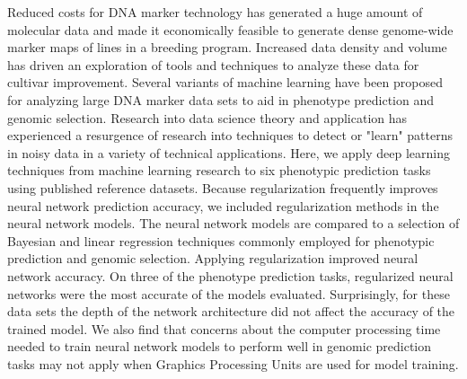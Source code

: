 

Reduced costs for DNA marker technology has generated a huge amount of
molecular data and made it economically feasible to generate dense genome-wide
marker maps of lines in a breeding program. Increased data density and volume
has driven an exploration of tools and techniques to analyze these data for
cultivar improvement. Several variants of machine learning have been proposed
for analyzing large DNA marker data sets to aid in phenotype prediction and genomic selection.
Research into data science theory and application has experienced
a resurgence of research into techniques to detect or "learn" patterns in noisy
data in a variety of technical applications. 
Here, we apply deep learning techniques from machine learning research to six 
phenotypic prediction tasks using published reference datasets. Because regularization
frequently improves neural network prediction accuracy, we included regularization
methods in the neural network models.
The neural network models are compared to a selection of Bayesian and 
linear regression techniques commonly employed for phenotypic prediction and
genomic selection. Applying regularization improved neural network
accuracy. On three of the phenotype prediction tasks, regularized neural networks 
were the most accurate of the models evaluated. Surprisingly, for these data sets
the depth of the network architecture did not affect the accuracy of the trained 
model. We also find that concerns about the computer processing
time needed to train neural network models to perform well in genomic prediction 
tasks may not apply when Graphics Processing Units are used for model training.


%

